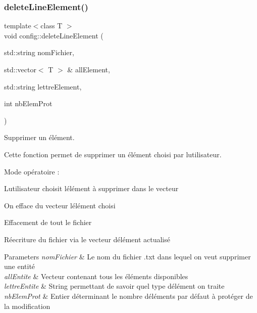 \subsubsection{\texorpdfstring{delete\+Line\+Element()}{deleteLineElement()}}
{\footnotesize\ttfamily template$<$class T $>$ \\
void config\+::delete\+Line\+Element (\begin{DoxyParamCaption}\item[{std\+::string}]{nom\+Fichier,  }\item[{std\+::vector$<$ T $>$ \&}]{all\+Element,  }\item[{std\+::string}]{lettre\+Element,  }\item[{int}]{nb\+Elem\+Prot }\end{DoxyParamCaption})\hspace{0.3cm}{\ttfamily [inline]}}



Supprimer un élément. 

Cette fonction permet de supprimer un élément choisi par l\textquotesingle{}utilisateur.

Mode opératoire \+:
\begin{DoxyItemize}
\item L\textquotesingle{}utilisateur choisit l\textquotesingle{}élément à supprimer dans le vecteur
\item On efface du vecteur l\textquotesingle{}élément choisi
\item Effacement de tout le fichier
\item Réecriture du fichier via le vecteur d\textquotesingle{}élément actualisé 
\begin{DoxyParams}{Parameters}
{\em nom\+Fichier} & Le nom du fichier .txt dans lequel on veut supprimer une entité \\
\hline
{\em all\+Entite} & Vecteur contenant tous les éléments disponibles \\
\hline
{\em lettre\+Entite} & String permettant de savoir quel type d\textquotesingle{}élément on traite \\
\hline
{\em nb\+Elem\+Prot} & Entier déterminant le nombre d\textquotesingle{}éléments par défaut à protéger de la modification \\
\hline
\end{DoxyParams}

\end{DoxyItemize}\mbox{\label{classconfig_acf29a316025d6a8f05219a1f95f6d272}} 
